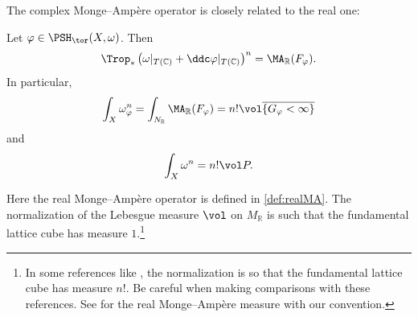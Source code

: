 The complex Monge--Ampère operator is closely related to the real one:
\begin{proposition}\label{prop:toricMAandrealMA}
    Let $\varphi\in \PSH_{\tor}(X,\omega)$. Then
    \begin{equation}\label{eq:tropMAmea}
    \Trop_* \left(\omega|_{T(\mathbb{C})}+\ddc\varphi|_{T(\mathbb{C})} \right)^n=\MA_{\mathbb{R}}(F_{\varphi}).
    \end{equation}
    In particular,
    \[
        \int_X \omega_{\varphi}^n =\int_{N_{\mathbb{R}}}\MA_{\mathbb{R}}(F_{\varphi})=n! \vol \overline{\{G_{\varphi}<\infty\}}
    \]
    and
    \[
        \int_X  \omega^n=n!\vol P.
    \]
\end{proposition}
Here the real Monge--Ampère operator is defined in \cref{def:realMA}. The normalization of the Lebesgue measure $\vol$ on $M_{\mathbb{R}}$ is such that the fundamental lattice cube has measure $1$.\footnote{In some references like \cite{GKZ08}, the normalization is so that the fundamental lattice cube has measure $n!$. Be careful when making comparisons with these references. See \cite[Theorem~18.4.1]{FPT} for the real Monge--Amp\`ere measure with our convention.}
